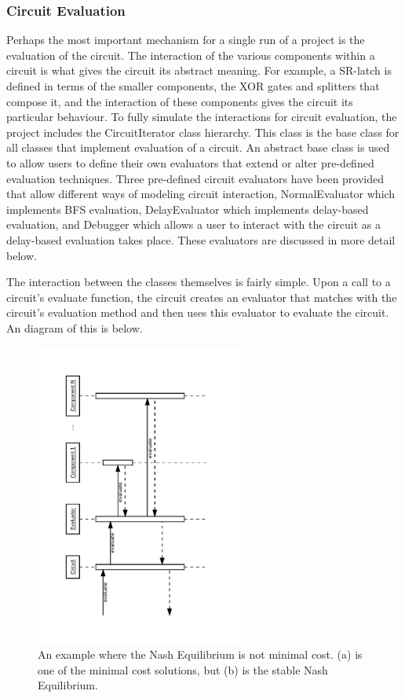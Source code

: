 \documentclass{article}
\begin{document}
\subsubsection{Circuit Evaluation}

Perhaps the most important mechanism for a single run of a project is the evaluation of the circuit. The interaction of the various components within a circuit is what gives the circuit its abstract meaning. For example, a SR-latch is defined in terms of the smaller components, the XOR gates and splitters that compose it, and the interaction of these components gives the circuit its particular behaviour. To fully simulate the interactions for circuit evaluation, the project includes the CircuitIterator class hierarchy. This class is the base class for all classes that implement evaluation of a circuit.  An abstract base class is used to allow users to define their own evaluators that extend or alter pre-defined evaluation techniques. Three pre-defined circuit evaluators have been provided that allow different ways of modeling circuit interaction, NormalEvaluator which implements BFS evaluation, DelayEvaluator which implements delay-based evaluation, and Debugger which allows a user to interact with the circuit as a delay-based evaluation takes place. These evaluators are discussed in more detail below.

The interaction between the classes themselves is fairly simple. Upon a call to a circuit’s evaluate function, the circuit creates an evaluator that matches with the circuit’s evaluation method and then uses this evaluator to evaluate the circuit. An diagram of this is below.

\begin{figure}[H]
    \begin{center}
        \includegraphics[angle=270,width=200pt]{imgs/CircuitEvaluationInteraction.pdf}
    \end{center}
    \caption{An example where the Nash Equilibrium is not minimal cost.
        (a) is one of the minimal cost solutions, but (b) is the stable Nash
        Equilibrium.}
\end{figure}
\end{document}

